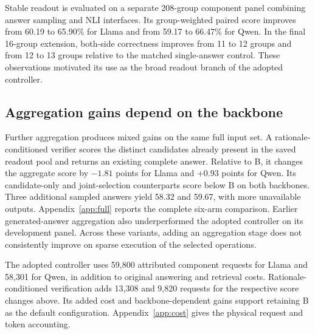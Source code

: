 Stable readout is evaluated on a separate 208-group component panel combining answer sampling and NLI interfaces. Its group-weighted paired score improves from 60.19 to 65.90\% for Llama and from 59.17 to 66.47\% for Qwen. In the final 16-group extension, both-side correctness improves from 11 to 12 groups and from 12 to 13 groups relative to the matched single-answer control. These observations motivated its use as the broad readout branch of the adopted controller.

\subsection{Aggregation gains depend on the backbone}
\label{sec:extensions}

Further aggregation produces mixed gains on the same full input set. A rationale-conditioned verifier scores the distinct candidates already present in the saved readout pool and returns an existing complete answer. Relative to B, it changes the aggregate score by $-1.81$ points for Llama and $+0.93$ points for Qwen. Its candidate-only and joint-selection counterparts score below B on both backbones. Three additional sampled answers yield 58.32 and 59.67, with more unavailable outputs. Appendix~\ref{app:full} reports the complete six-arm comparison. Earlier generated-answer aggregation also underperformed the adopted controller on its development panel. Across these variants, adding an aggregation stage does not consistently improve on sparse execution of the selected operations.

The adopted controller uses 59,800 attributed component requests for Llama and 58,301 for Qwen, in addition to original answering and retrieval costs. Rationale-conditioned verification adds 13,308 and 9,820 requests for the respective score changes above. Its added cost and backbone-dependent gains support retaining B as the default \cfmoa{} configuration. Appendix~\ref{app:cost} gives the physical request and token accounting.

